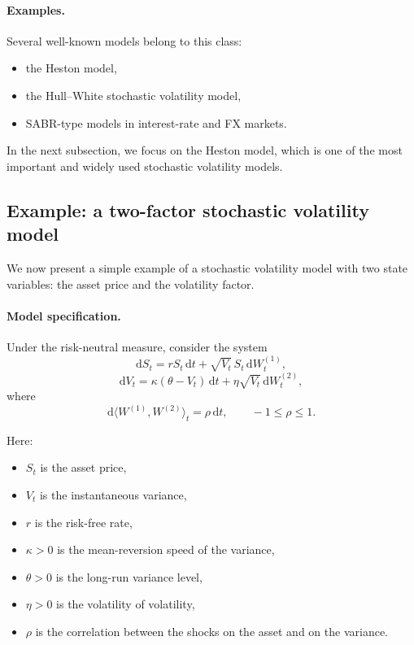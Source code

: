 \documentclass[11pt]{article}
\theoremstyle{plain}
\theoremstyle{definition}
\theoremstyle{remark}
\begin{document}
\paragraph{Examples.}
Several well-known models belong to this class:
\begin{itemize}[leftmargin=1.4em]
    \item the Heston model,
    \item the Hull--White stochastic volatility model,
    \item SABR-type models in interest-rate and FX markets.
\end{itemize}

In the next subsection, we focus on the Heston model, which is one of
the most important and widely used stochastic volatility models.


\subsection{Example: a two-factor stochastic volatility model}

We now present a simple example of a stochastic volatility model with
two state variables: the asset price and the volatility factor.

\paragraph{Model specification.}
Under the risk-neutral measure, consider the system
\[
\mathrm{d}S_t
=
rS_t\,\mathrm{d}t
+
\sqrt{V_t}\,S_t\,\mathrm{d}W_t^{(1)},
\]
\[
\mathrm{d}V_t
=
\kappa(\theta-V_t)\,\mathrm{d}t
+
\eta\sqrt{V_t}\,\mathrm{d}W_t^{(2)},
\]
where
\[
\mathrm{d}\langle W^{(1)},W^{(2)}\rangle_t=\rho\,\mathrm{d}t,
\qquad -1\le \rho\le 1.
\]

Here:
\begin{itemize}[leftmargin=1.4em]
    \item \(S_t\) is the asset price,
    \item \(V_t\) is the instantaneous variance,
    \item \(r\) is the risk-free rate,
    \item \(\kappa>0\) is the mean-reversion speed of the variance,
    \item \(\theta>0\) is the long-run variance level,
    \item \(\eta>0\) is the volatility of volatility,
    \item \(\rho\) is the correlation between the shocks on the asset and on the variance.
\end{itemize}
\end{document}
